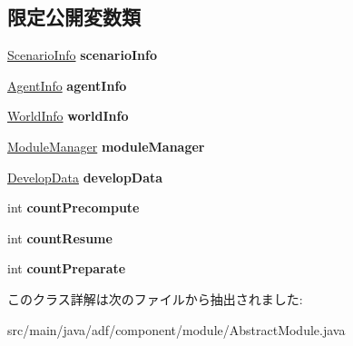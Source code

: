 \subsection*{限定公開変数類}
\begin{DoxyCompactItemize}
\item 
\hypertarget{classadf_1_1component_1_1module_1_1AbstractModule_a4f3c28aad990c2d969f06f0cd7955281}{}\label{classadf_1_1component_1_1module_1_1AbstractModule_a4f3c28aad990c2d969f06f0cd7955281} 
\hyperlink{classadf_1_1agent_1_1info_1_1ScenarioInfo}{Scenario\+Info} {\bfseries scenario\+Info}
\item 
\hypertarget{classadf_1_1component_1_1module_1_1AbstractModule_a7899d34c90df44723cdcb35653735a54}{}\label{classadf_1_1component_1_1module_1_1AbstractModule_a7899d34c90df44723cdcb35653735a54} 
\hyperlink{classadf_1_1agent_1_1info_1_1AgentInfo}{Agent\+Info} {\bfseries agent\+Info}
\item 
\hypertarget{classadf_1_1component_1_1module_1_1AbstractModule_a55634f32bad39f01c25258278fbc37aa}{}\label{classadf_1_1component_1_1module_1_1AbstractModule_a55634f32bad39f01c25258278fbc37aa} 
\hyperlink{classadf_1_1agent_1_1info_1_1WorldInfo}{World\+Info} {\bfseries world\+Info}
\item 
\hypertarget{classadf_1_1component_1_1module_1_1AbstractModule_a4e44edcd327e67f929c357b77b127f89}{}\label{classadf_1_1component_1_1module_1_1AbstractModule_a4e44edcd327e67f929c357b77b127f89} 
\hyperlink{classadf_1_1agent_1_1module_1_1ModuleManager}{Module\+Manager} {\bfseries module\+Manager}
\item 
\hypertarget{classadf_1_1component_1_1module_1_1AbstractModule_aa7337d08e34428dfc5baa9582c3d4444}{}\label{classadf_1_1component_1_1module_1_1AbstractModule_aa7337d08e34428dfc5baa9582c3d4444} 
\hyperlink{classadf_1_1agent_1_1develop_1_1DevelopData}{Develop\+Data} {\bfseries develop\+Data}
\item 
\hypertarget{classadf_1_1component_1_1module_1_1AbstractModule_ac27522e5285817688c6bf7d9d23aec08}{}\label{classadf_1_1component_1_1module_1_1AbstractModule_ac27522e5285817688c6bf7d9d23aec08} 
int {\bfseries count\+Precompute}
\item 
\hypertarget{classadf_1_1component_1_1module_1_1AbstractModule_a7c11281a28a021a7a02349ca0c870ecf}{}\label{classadf_1_1component_1_1module_1_1AbstractModule_a7c11281a28a021a7a02349ca0c870ecf} 
int {\bfseries count\+Resume}
\item 
\hypertarget{classadf_1_1component_1_1module_1_1AbstractModule_a2b9f46eb6fcf94d9ef69d39365559b02}{}\label{classadf_1_1component_1_1module_1_1AbstractModule_a2b9f46eb6fcf94d9ef69d39365559b02} 
int {\bfseries count\+Preparate}
\end{DoxyCompactItemize}


このクラス詳解は次のファイルから抽出されました\+:\begin{DoxyCompactItemize}
\item 
src/main/java/adf/component/module/Abstract\+Module.\+java\end{DoxyCompactItemize}
